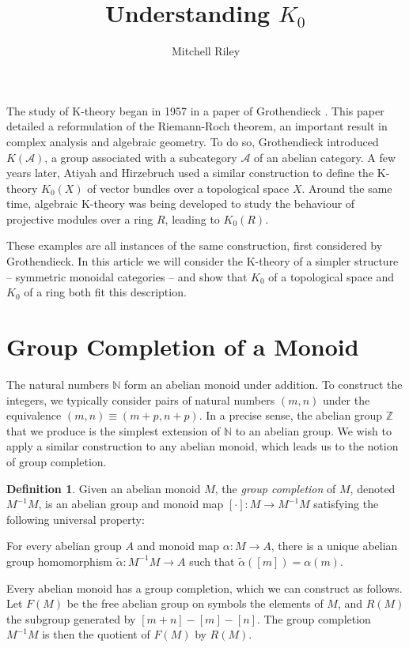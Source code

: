 \documentclass[10pt,a4paper]{article}
\author{Mitchell Riley}
\title{Understanding $K_0$}
\theoremstyle{definition}
\newtheorem{definition}[theorem]{Definition}
\begin{document}
\maketitle

The study of K-theory began in 1957 in a paper of Grothendieck \cite{grothendieck1957}. This paper detailed a reformulation of the Riemann-Roch theorem, an important result in complex analysis and algebraic geometry. To do so, Grothendieck introduced $K(\mathcal{A})$, a group associated with a subcategory $\mathcal{A}$ of an abelian category. A few years later, Atiyah and Hirzebruch used a similar construction to define the K-theory $K_0(X)$ of vector bundles over a topological space $X$. Around the same time, algebraic K-theory was being developed to study the behaviour of projective modules over a ring $R$, leading to $K_0(R)$.

These examples are all instances of the same construction, first considered by Grothendieck. In this article we will consider the K-theory of a simpler structure -- symmetric monoidal categories -- and show that $K_0$ of a topological space and $K_0$ of a ring both fit this description.

\section{Group Completion of a Monoid}

The natural numbers $\mathbb{N}$ form an abelian monoid under addition. To construct the integers, we typically consider pairs of natural numbers $(m, n)$ under the equivalence $(m, n) \equiv (m+p, n+p)$. In a precise sense, the abelian group $\mathbb{Z}$ that we produce is the simplest extension of $\mathbb{N}$ to an abelian group. We wish to apply a similar construction to any abelian monoid, which leads us to the notion of group completion.

\begin{definition}
Given an abelian monoid $M$, the \emph{group completion} of $M$, denoted $M^{-1} M$, is an abelian group and monoid map $[ \cdot ] : M \to M^{-1}M$ satisfying the following universal property:

For every abelian group $A$ and monoid map $\alpha : M \to A$, there is a unique abelian group homomorphism $\tilde{\alpha} : M^{-1}M \to A$ such that $\tilde{\alpha}([m]) = \alpha(m)$.
\end{definition}

Every abelian monoid has a group completion, which we can construct as follows. Let $F(M)$ be the free abelian group on symbols the elements of $M$, and $R(M)$ the subgroup generated by $[m+n] - [m] - [n]$. The group completion $M^{-1} M$ is then the quotient of $F(M)$ by $R(M)$.
\end{document}
